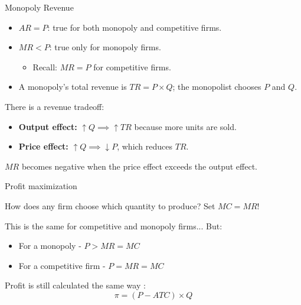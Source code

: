 \documentclass[compress]{beamer}
\begin{document}
\begin{frame}{Monopoly Revenue}
\begin{itemize}
    \item $AR = P$: true for both monopoly and competitive firms.
    \item $MR < P$: true only for monopoly firms.
    \begin{itemize}
        \item Recall: $MR = P$ for competitive firms.
    \end{itemize}
    \item A monopoly’s total revenue is $TR = P \times Q$; the monopolist chooses $P$ and $Q$.
\end{itemize}

\begin{block}{There is a revenue tradeoff:}
        \begin{itemize}
            \item \textbf{Output effect:} $\uparrow Q \implies \uparrow TR$ because more units are sold.
            \item \textbf{Price effect:} $\uparrow Q \implies \downarrow P$, which reduces $TR$.
        \end{itemize}

    $MR$ becomes negative when the price effect exceeds the output effect.
\end{block}
\end{frame}


\begin{frame}{Profit maximization}
  \begin{block}{How does any firm choose which quantity to produce? }
    Set $MC = MR$!
  \end{block}
  \vspace{2mm}
  This is the same for competitive and monopoly firms... But:
  \begin{itemize}
      \item For a monopoly - $P > MR = MC$
      \item For a competitive firm - $P = MR = MC$
  \end{itemize}
  
  \vspace{3mm}

  Profit is still calculated the same way :
  \[\pi = (P - ATC)\times Q\]
\end{frame}
\end{document}
